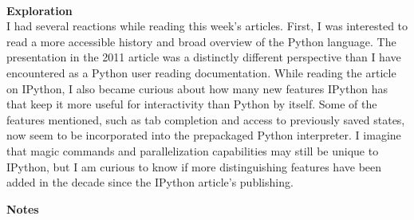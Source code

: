 \documentclass{report}
\begin{document}
\-\\
\textbf{Exploration}\\
I had several reactions while reading this week's articles. First, I was interested to read a more accessible history and broad overview of the Python language. The presentation in the 2011 article was a distinctly different perspective than I have encountered as a Python user reading documentation. While reading the article on IPython, I also became curious about how many new features IPython has that keep it more useful for interactivity than Python by itself. Some of the features mentioned, such as tab completion and access to previously saved states, now seem to be incorporated into the prepackaged Python interpreter. I imagine that magic commands and parallelization capabilities may still be unique to IPython, but I am curious to know if more distinguishing features have been added in the decade since the IPython article's publishing.

\newpage

\textbf{Notes}\\
\end{document}
